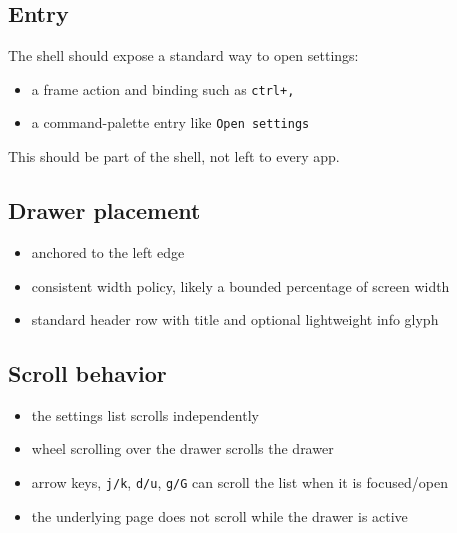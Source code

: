 \subsection{Entry}\label{record-057-entry}

The shell should expose a standard way to open settings:

\begin{itemize}
\tightlist
\item
  a frame action and binding such as \texttt{c\allowbreak{}t\allowbreak{}r\allowbreak{}l\allowbreak{}+\allowbreak{},}
\item
  a command-palette entry like \texttt{O\allowbreak{}p\allowbreak{}e\allowbreak{}n\allowbreak{} \allowbreak{}s\allowbreak{}e\allowbreak{}t\allowbreak{}t\allowbreak{}i\allowbreak{}n\allowbreak{}g\allowbreak{}s}
\end{itemize}

This should be part of the shell, not left to every app.

\subsection{Drawer placement}\label{record-057-drawer-placement}

\begin{itemize}
\tightlist
\item
  anchored to the left edge
\item
  consistent width policy, likely a bounded percentage of screen width
\item
  standard header row with title and optional lightweight info glyph
\end{itemize}

\subsection{Scroll behavior}\label{record-057-scroll-behavior}

\begin{itemize}
\tightlist
\item
  the settings list scrolls independently
\item
  wheel scrolling over the drawer scrolls the drawer
\item
  arrow keys, \texttt{j\allowbreak{}/\allowbreak{}k}, \texttt{d\allowbreak{}/\allowbreak{}u}, \texttt{g\allowbreak{}/\allowbreak{}G} can scroll the list when it is focused/open
\item
  the underlying page does not scroll while the drawer is active
\end{itemize}

